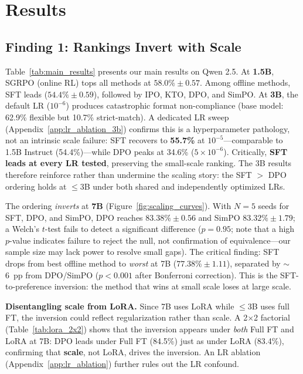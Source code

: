 \documentclass{article}
\begin{document}
\section{Results}

\subsection{Finding 1: Rankings Invert with Scale}
\label{sec:ranking_inversion}

Table~\ref{tab:main_results} presents our main results on Qwen 2.5.
At \textbf{1.5B}, SGRPO (online RL) tops all methods at $58.0\% \pm 0.57$. Among offline methods, SFT leads ($54.4\% \pm 0.59$), followed by IPO, KTO, DPO, and SimPO.
At \textbf{3B}, the default LR ($10^{-6}$) produces catastrophic format non-compliance (base model: 62.9\% flexible but 10.7\% strict-match). A dedicated LR sweep (Appendix~\ref{app:lr_ablation_3b}) confirms this is a hyperparameter pathology, not an intrinsic scale failure: SFT recovers to \textbf{55.7\%} at $10^{-5}$---comparable to 1.5B Instruct (54.4\%)---while DPO peaks at 34.6\% ($5{\times}10^{-6}$). Critically, \textbf{SFT leads at every LR tested}, preserving the small-scale ranking. The 3B results therefore reinforce rather than undermine the scaling story: the SFT $>$ DPO ordering holds at $\leq$3B under both shared and independently optimized LRs.

The ordering \emph{inverts} at \textbf{7B} (Figure~\ref{fig:scaling_curves}).
With $N{=}5$ seeds for SFT, DPO, and SimPO, DPO reaches $83.38\% \pm 0.56$ and SimPO $83.32\% \pm 1.79$; a Welch's $t$-test fails to detect a significant difference ($p = 0.95$; note that a high $p$-value indicates failure to reject the null, not confirmation of equivalence---our sample size may lack power to resolve small gaps).
The critical finding: SFT drops from best offline method to \emph{worst} at 7B ($77.38\% \pm 1.11$), separated by ${\sim}$6~pp from DPO/SimPO ($p < 0.001$ after Bonferroni correction).
This is the SFT-to-preference inversion: the method that wins at small scale loses at large scale.

\textbf{Disentangling scale from LoRA.}
Since 7B uses LoRA while $\leq$3B uses full FT, the inversion could reflect regularization rather than scale.
A 2$\times$2 factorial (Table~\ref{tab:lora_2x2}) shows that the inversion appears under \emph{both} Full FT and LoRA at 7B: DPO leads under Full FT (84.5\%) just as under LoRA (83.4\%), confirming that \textbf{scale}, not LoRA, drives the inversion. An LR ablation (Appendix~\ref{app:lr_ablation}) further rules out the LR confound.
\end{document}
